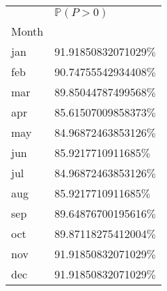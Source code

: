 \begin{tabular}{ll}
\toprule
{} &    $\mathbb{P}(P > 0)$ \\
Month &                        \\
\midrule
jan   &  91.91850832071029$\%$ \\
feb   &  90.74755542934408$\%$ \\
mar   &  89.85044787499568$\%$ \\
apr   &  85.61507009858373$\%$ \\
may   &  84.96872463853126$\%$ \\
jun   &   85.9217710911685$\%$ \\
jul   &  84.96872463853126$\%$ \\
aug   &   85.9217710911685$\%$ \\
sep   &  89.64876700195616$\%$ \\
oct   &  89.87118275412004$\%$ \\
nov   &  91.91850832071029$\%$ \\
dec   &  91.91850832071029$\%$ \\
\bottomrule
\end{tabular}
